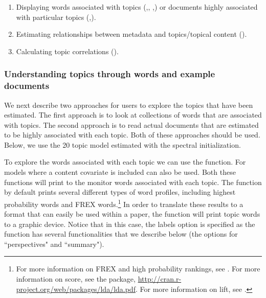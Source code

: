 \documentclass[article,shortnames]{jss}
\begin{document}
\begin{enumerate}
\item Displaying words associated with topics (,, ,) or documents highly associated with particular topics (,).
\item Estimating relationships between metadata and topics/topical content ().
\item Calculating topic correlations ().
\end{enumerate}

\subsubsection{Understanding topics through words and example documents}

We next describe two approaches for users to explore the topics that have been estimated. The first approach is to look at collections of words that are associated with topics. The second approach is to read actual documents that are estimated to be highly associated with each topic. Both of these approaches should be used. Below, we use the 20 topic model estimated with the spectral initialization.

To explore the words associated with each topic we can use the  function.  For models where a content covariate is included  can also be used. Both these functions will print to the monitor words associated with each topic. The function by default prints several different types of word profiles, including highest probability words and FREX words.\footnote{For more information on FREX and high probability rankings, see \citet{nips2013,stmjasa,ajps,TextComparative}. For more information on score, see the   package, \url{http://cran.r-project.org/web/packages/lda/lda.pdf}. For more information on lift, see \citet{taddy2012multinomial}.}  In order to translate these results to a format that can easily be used within a paper, the  function will print topic words to a graphic device. Notice that in this case, the labels option is specified as the  function has several functionalities that we describe below (the options for ``perspectives" and ``summary").
\end{document}
